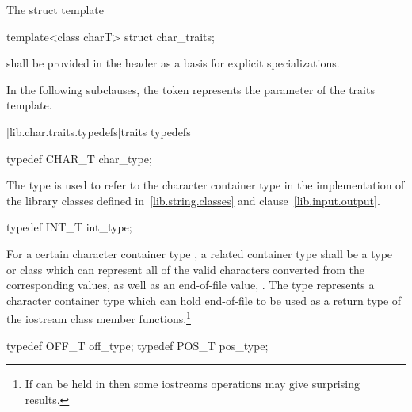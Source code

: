 \pnum
The struct template

%
\begin{codeblock}
template<class charT> struct char_traits;
\end{codeblock}

shall be provided in the header
as a basis for explicit specializations.

\pnum
In the following subclauses, the token  represents the parameter
of the traits template.

[lib.char.traits.typedefs]{traits typedefs}

%
%
\begin{itemdecl}
typedef CHAR_T char_type;
\end{itemdecl}

\begin{itemdescr}
\pnum
The type
is used to refer to the character container type
in the implementation of the library classes defined in~\ref{lib.string.classes} and clause~\ref{lib.input.output}.
\end{itemdescr}

%
%
\begin{itemdecl}
typedef INT_T int_type;
\end{itemdecl}

\begin{itemdescr}
\pnum
\requires
For a certain character container type
,
a related container type
shall be a type or class which can represent all of the
valid characters converted from the corresponding
values, as well as an end-of-file value,
.
The type
represents a character container type
which can hold end-of-file to be used as a return type
of the iostream class member functions.\footnote{If
can be held in
then some iostreams operations may give surprising results.}
\end{itemdescr}

%
%
%
%
\begin{itemdecl}
typedef OFF_T off_type;
typedef POS_T pos_type;
\end{itemdecl}


